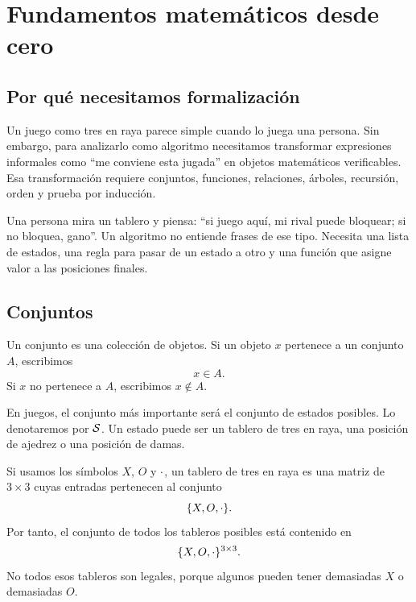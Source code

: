 \chapter{Fundamentos matemáticos desde cero}

\section{Por qué necesitamos formalización}

Un juego como tres en raya parece simple cuando lo juega una persona. Sin embargo, para analizarlo como algoritmo necesitamos transformar expresiones informales como ``me conviene esta jugada'' en objetos matemáticos verificables. Esa transformación requiere conjuntos, funciones, relaciones, árboles, recursión, orden y prueba por inducción.

\begin{intuitionbox}
Una persona mira un tablero y piensa: ``si juego aquí, mi rival puede bloquear; si no bloquea, gano''. Un algoritmo no entiende frases de ese tipo. Necesita una lista de estados, una regla para pasar de un estado a otro y una función que asigne valor a las posiciones finales.
\end{intuitionbox}

\section{Conjuntos}

\begin{definition}[Conjunto]
Un conjunto es una colección de objetos. Si un objeto $x$ pertenece a un conjunto $A$, escribimos
\[
 x \in A.
\]
Si $x$ no pertenece a $A$, escribimos $x \notin A$.
\end{definition}

En juegos, el conjunto más importante será el conjunto de estados posibles. Lo denotaremos por $\mathcal{S}$. Un estado puede ser un tablero de tres en raya, una posición de ajedrez o una posición de damas.

\begin{example}
Si usamos los símbolos $X$, $O$ y $\cdot$, un tablero de tres en raya es una matriz de $3\times 3$ cuyas entradas pertenecen al conjunto
\[
\{X,O,\cdot\}.
\]
Por tanto, el conjunto de todos los tableros posibles está contenido en
\[
\{X,O,\cdot\}^{3\times 3}.
\]
No todos esos tableros son legales, porque algunos pueden tener demasiadas $X$ o demasiadas $O$.
\end{example}

